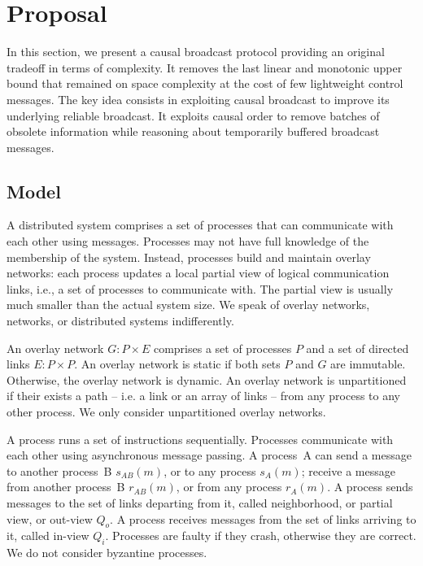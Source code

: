 
\section{Proposal}
\label{sec:proposal}

In this section, we present a causal broadcast protocol providing an original
tradeoff in terms of complexity. It removes the last linear and monotonic upper
bound that remained on space complexity at the cost of few lightweight control
messages. The key idea consists in exploiting causal broadcast to improve its
underlying reliable broadcast.  It exploits causal order to remove batches of
obsolete information while reasoning about temporarily buffered broadcast
messages.

\subsection{Model}

A distributed system comprises a set of processes that can communicate with each
other using messages. Processes may not have full knowledge of the membership of
the system. Instead, processes build and maintain overlay networks: each process
updates a local partial view of logical communication links, i.e., a set of
processes to communicate with. The partial view is usually much smaller than the
actual system size. We speak of overlay networks, networks, or distributed
systems indifferently.

\begin{definition}
  An overlay network $G: P \times E$ comprises a set of processes $P$ and a set
  of directed links $E: P \times P$.  An overlay network is static if both sets
  $P$ and $G$ are immutable. Otherwise, the overlay network is dynamic. An
  overlay network is unpartitioned if their exists a path -- i.e. a link or an
  array of links -- from any process to any other process. We only consider
  unpartitioned overlay networks.
\end{definition}

\begin{definition}[Process]
  A process runs a set of instructions sequentially. Processes communicate with
  each other using asynchronous message passing. A process~A can send a message
  to another process~B $s_{AB}(m)$, or to any process $s_A(m)$; receive a
  message from another process~B $r_{AB}(m)$, or from any process $r_A(m)$. A
  process sends messages to the set of links departing from it, called
  neighborhood, or partial view, or out-view $Q_o$. A process receives messages
  from the set of links arriving to it, called in-view $Q_i$.  Processes are
  faulty if they crash, otherwise they are correct. We do not consider byzantine
  processes.
\end{definition}

